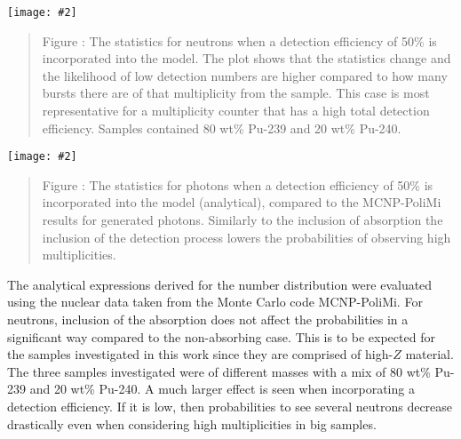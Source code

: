 \documentclass[landscape,a0,final,a4resizeable]{a0poster}
\newenvironment{poster}{
  \begin{center}
  \begin{minipage}[c]{0.98\textwidth}
}{
  \end{minipage}
  \end{center}
}
\newcommand{\pbox}[4]{
\psshadowbox[#3]{
\begin{minipage}[t][#2][t]{#1}
#4
\end{minipage}
}}
\newcommand{\myfig}[3][0]{
\begin{center}
  \vspace{1.5cm}
  \texttt{[image: \#2]}
  \nobreak\medskip
\end{center}}
\newcommand{\mycaption}[1]{
  \vspace{0.5cm}
  \begin{quote}
    {{\sc Figure} \arabic{figure}: #1}
  \end{quote}
  \vspace{1cm}
  \stepcounter{figure}
}
\begin{document}
\begin{poster}
\begin{multicols}{4}
\vspace{2cm}\begin{center}\pbox{0.8\columnwidth}{}{linewidth=2mm,framearc=0.1,linecolor=lightblue,fillstyle=gradient,gradangle=0,gradbegin=white,gradend=whiteblue,gradmidpoint=1.0,framesep=1em}{\begin{center}\Large
\bf Results \end{center}}\end{center}\vspace{1.25cm}

\vspace{-2.0cm}
\begin{center}
  \myfig{detneutBIG.eps}{0.7}
  \mycaption{The statistics for neutrons when a detection
efficiency of 50\% is incorporated into the model. The plot shows
that the statistics change and the likelihood of low detection
numbers are higher compared to how many bursts there are of that
multiplicity from the sample. This case is most representative for
a multiplicity counter that has a high total detection efficiency.
Samples contained 80 wt\% Pu-239 and 20 wt\% Pu-240.}
\end{center}

\vspace{-2.0cm}
\begin{center}
  \myfig{detgammaBIG.eps}{0.7}
  \mycaption{The statistics for photons when a detection
efficiency of 50\% is incorporated into the model (analytical),
compared to the MCNP-PoliMi results for generated photons.
Similarly to the inclusion of absorption the inclusion of the
detection process lowers the probabilities of observing high
multiplicities.}
\end{center}

The analytical expressions derived for the number distribution
were evaluated using the nuclear data taken from the Monte Carlo
code MCNP-PoliMi. For neutrons, inclusion of the absorption does
not affect the probabilities in a significant way compared to the
non-absorbing case. This is to be expected for the samples
investigated in this work since they are comprised of high-$Z$
material. The three samples investigated were of different masses
with a mix of 80 wt\% Pu-239 and 20 wt\% Pu-240. A much larger
effect is seen when incorporating a detection efficiency. If it is
low, then probabilities to see several neutrons decrease
drastically even when considering high multiplicities in big
samples.



\end{multicols}
\end{poster}
\end{document}
